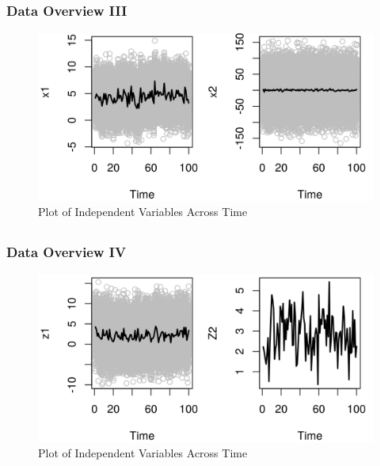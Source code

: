 \documentclass{beamer}\usepackage[]{graphicx}\usepackage[]{color}
\makeatletter
\def\maxwidth{ %
  \ifdim\Gin@nat@width>\linewidth
    \linewidth
  \else
    \Gin@nat@width
  \fi
}
\newenvironment{knitrout}{}{} %
\makeatother
\begin{document}
\subsection{}
\begin{frame}%
\frametitle{Data Overview III}
\begin{figure}[ht]\centering
\caption{Plot of Independent Variables Across Time}
\begin{knitrout}
\color{fgcolor}
\includegraphics[width=\maxwidth]{figure/e-1} 

\end{knitrout}
\end{figure}
\end{frame}

\subsection{}
\begin{frame}%
\frametitle{Data Overview IV}
\begin{figure}[ht]\centering
\caption{Plot of Independent Variables Across Time}
\begin{knitrout}
\color{fgcolor}
\includegraphics[width=\maxwidth]{figure/f-1} 

\end{knitrout}
\end{figure}
\end{frame}
\end{document}
